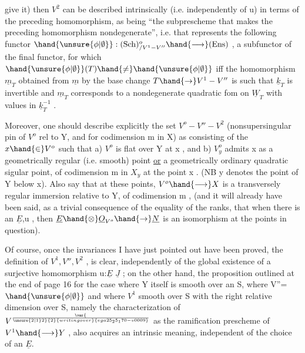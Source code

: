 give it) then $V^2$ can be described intrinsically (i.e. independently of u)
 in terms of the preceding homomorphism, as being ``the subprescheme
that makes the preceding homomorphism nondegenerate'', i.e. that represents the
following functor $\hand{\unsure{\phi|\emptyset}} : (\mathrm{Sch})^{o}_{/V^1 - V''} \hand{\longrightarrow} (\mathrm{Ens})$ , a subfunctor
of the final functor, for which $\hand{\unsure{\phi|\emptyset}}(T)\hand{\neq} \hand{\unsure{\phi|\emptyset}}$ iff the homomorphism $\underline{m}_T$ obtained
from $\underline{m}$ by the base change $T \hand{\to} V^1 - V''$ is such that $\underline{k}_T$ is invertible and
$\underline{m}_T$ corresponds to a nondegenerate quadratic fom on $\underline{W}_T$ with values in
$\underline{k}_T^{-1}$ .

Moreover, one should describe explicitly the set $V^o - V'' - V^2$ 
(nonsupersingular pin of $V^o$ rel to Y, and for codimension m in X)
as consisting of the $x \hand{\in} V^o$ such that a) $V^o$ is flat over Y at x , and
b) $V^o_y$ admits x as a geometrically regular (i.e. smooth) point \uline{or}
a geometrically ordinary quadratic sigular point, of codimension m in $X_y$
at the point x . (NB y denotes the point of Y below x). Also say that at these
points, $V^o \hand{\longrightarrow} X$ is a transversely regular immersion relative to
Y, of codimension m , (and it will already have been said, as a trivial consequence of
the equality of the ranks, that when there is an $\underline{E}$,u , then $\underline{E}\hand{\otimes}\underline{O}_{V^o} \hand{\to} \underline{N}$ is an
isomorphism at the points in question).

Of course, once the invariances I have just pointed out have been proved,
the definition of $V^1, V'', V^2$ ,  is clear, independently
of the global existence of a surjective homomorphism u:$\underline{E}$ \quad $\underline{J}$ ; on the other hand,
the proposition outlined at the end of page 16 for the case where Y itself is
smooth over an S, where V''= $\hand{\unsure{\phi|\emptyset}}$ and where \hand{,} $V^1$  smooth over S with the right relative
dimension over S,  namely the characterization of $V^{\var{\over{\unsure{2|1}}{2}}{2}{writing over}{ega25_25_170-v0009}}$ as the
ramification prescheme of $V^1 \hand{\longrightarrow} Y$ , also acquires an intrinsic meaning,
independent of the choice of an $\underline{E}$.

